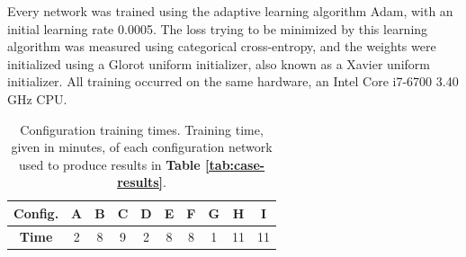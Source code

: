 \noindent Every network was trained using the adaptive learning algorithm Adam, with an initial learning rate 0.0005. The loss trying to be minimized by this learning algorithm was measured using categorical cross-entropy, and the weights were initialized using a Glorot uniform initializer, also known as a Xavier uniform initializer. All training occurred on the same hardware, an Intel\textregistered{} Core\texttrademark{} i7-6700 3.40 GHz CPU. 



\begin{table}[h!]
\begin{center}
\begin{tabular}{|c|c|c|c|c|c|c|c|c|c|}
\hline
\textbf{Config.} & A & B & C & D & E & F & G & H & I \\ \hline
\textbf{Time} & 2 & 8 & 9 & 2 & 8 & 8 & 1 & 11 & 11 \\ \hline
\end{tabular}
\end{center}
\caption[Configuration training times]{Configuration training times. Training time, given in minutes, of each configuration network used to produce results in \textbf{Table \ref{tab:case-results}}.}
\label{tab:train-times}
\end{table}


\cleardoublepage